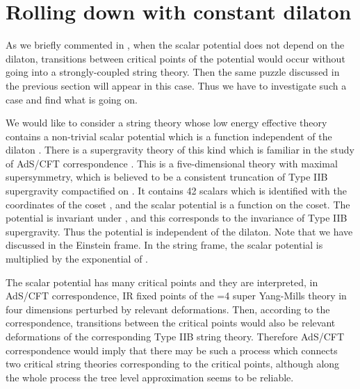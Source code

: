 \documentclass[a4paper,a4paper]{article}
\begin{document}
\vspace{1cm}

\section{Rolling down with constant dilaton}  \label{Dindep}

\vspace{5mm}

As we briefly commented in \cite{suyama}, when the scalar potential does not depend on the dilaton, transitions 
between critical points of the potential would occur without going into a strongly-coupled string theory. 
Then the same puzzle discussed in the previous section will appear in this case.  
Thus we have to investigate such a case and find what is going on. 

We would like to consider a string theory whose low energy effective theory contains a non-trivial scalar 
potential which is a function independent of the dilaton \myHighlight{$\Phi$}\coordHE{}. 
There is a supergravity theory of this kind \cite{5dim1}\cite{5dim2} which is familiar in the study of AdS/CFT 
correspondence \cite{AdS/CFT}. 
This is a five-dimensional theory with maximal supersymmetry, which is believed to be a consistent truncation of 
Type IIB supergravity compactified on \coordHE{}. 
It contains 42 scalars which is identified with the coordinates of the coset \coordHE{}, and the scalar 
potential is a function on the coset. 
The potential is invariant under \coordHE{}, and this corresponds to the 
\coordHE{} invariance of Type IIB supergravity. 
Thus the potential is independent of the dilaton. 
Note that we have discussed in the Einstein frame. 
In the string frame, the scalar potential is multiplied by the exponential of \myHighlight{$\Phi$}\coordHE{}. 

The scalar potential has many critical points \cite{5dim1}\cite{critical1}\cite{critical2}\cite{critical3} 
and they are interpreted, in AdS/CFT correspondence, IR fixed 
points of the \coordHE{}=4 super Yang-Mills theory in four dimensions perturbed by relevant deformations. 
Then, according to the correspondence, transitions between the critical points would also be relevant 
deformations of the corresponding Type IIB string theory. 
Therefore AdS/CFT correspondence would imply that there may be such a process which connects two critical string 
theories corresponding to the critical points, although along the whole process the tree level approximation 
seems to be reliable. 
\end{document}

